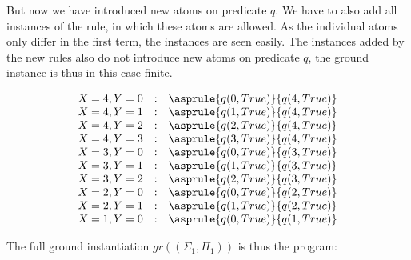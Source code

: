 \begin{example}
    But now we have introduced new atoms on predicate $q$. We have to also add
    all instances of the rule, in which these atoms are allowed.
    As the individual atoms only differ in the first term, the instances are
    seen easily. The instances added by the new rules also do not introduce
    new atoms on predicate $q$, the ground instance is thus in this case finite.

    \begin{equation*}
        \begin{matrix}
            X=4, Y=0 & : & \asprule{q(0, True)}{q(4, True)}\\
            X=4, Y=1 & : & \asprule{q(1, True)}{q(4, True)}\\
            X=4, Y=2 & : & \asprule{q(2, True)}{q(4, True)}\\
            X=4, Y=3 & : & \asprule{q(3, True)}{q(4, True)}\\
            X=3, Y=0 & : & \asprule{q(0, True)}{q(3, True)}\\
            X=3, Y=1 & : & \asprule{q(1, True)}{q(3, True)}\\
            X=3, Y=2 & : & \asprule{q(2, True)}{q(3, True)}\\
            X=2, Y=0 & : & \asprule{q(0, True)}{q(2, True)}\\
            X=2, Y=1 & : & \asprule{q(1, True)}{q(2, True)}\\
            X=1, Y=0 & : & \asprule{q(0, True)}{q(1, True)}\\
        \end{matrix}
    \end{equation*}

    The full ground instantiation $gr((\Sigma_1, \Pi_1))$ is thus the program:


\end{example}
